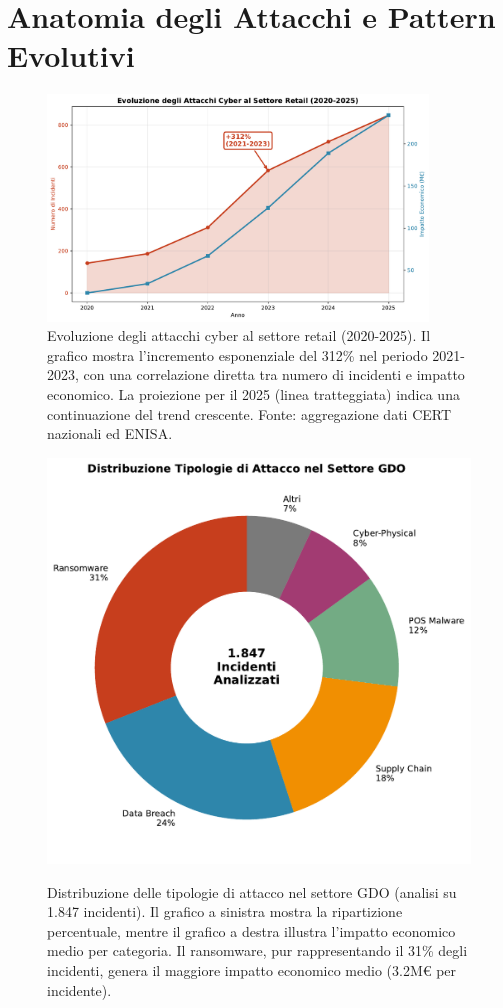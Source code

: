 \section{Anatomia degli Attacchi e Pattern Evolutivi}
\begin{figure}[htbp]
\centering
\includegraphics[width=0.9\textwidth]{thesis_figures/cap2/fig_2_1_cyber_evolution.pdf}
\caption{Evoluzione degli attacchi cyber al settore retail (2020-2025). Il grafico mostra l'incremento esponenziale del 312\% nel periodo 2021-2023, con una correlazione diretta tra numero di incidenti e impatto economico. La proiezione per il 2025 (linea tratteggiata) indica una continuazione del trend crescente. Fonte: aggregazione dati CERT nazionali ed ENISA.}
\label{fig:cyber_evolution}
\end{figure}
\begin{figure}[htbp]
\centering
\includegraphics[width=\textwidth]{thesis_figures/cap2/fig_2_2_attack_types.pdf}
\caption{Distribuzione delle tipologie di attacco nel settore GDO (analisi su 1.847 incidenti). Il grafico a sinistra mostra la ripartizione percentuale, mentre il grafico a destra illustra l'impatto economico medio per categoria. Il ransomware, pur rappresentando il 31\% degli incidenti, genera il maggiore impatto economico medio (3.2M€ per incidente).}\autocite{checkpoint2025}
\label{fig:attack_types}
\end{figure}
